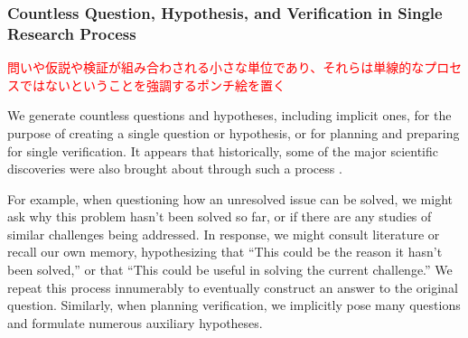 


\subsubsection{Countless Question, Hypothesis, and Verification in Single Research Process}


\textcolor{red}{問いや仮説や検証が組み合わされる小さな単位であり、それらは単線的なプロセスではないということを強調するポンチ絵を置く}

We generate countless questions and hypotheses, including implicit ones, for the purpose of creating a single question or hypothesis, or for planning and preparing for single verification. It appears that historically, some of the major scientific discoveries were also brought about through such a process \cite{hanson1965patterns,gribbin2022origin,whiteside1970before}.

For example, when questioning how an unresolved issue can be solved, we might ask why this problem hasn't been solved so far, or if there are any studies of similar challenges being addressed. In response, we might consult literature or recall our own memory, hypothesizing that ``This could be the reason it hasn't been solved,'' or that ``This could be useful in solving the current challenge.'' We repeat this process innumerably to eventually construct an answer to the original question. Similarly, when planning verification, we implicitly pose many questions and formulate numerous auxiliary hypotheses.

